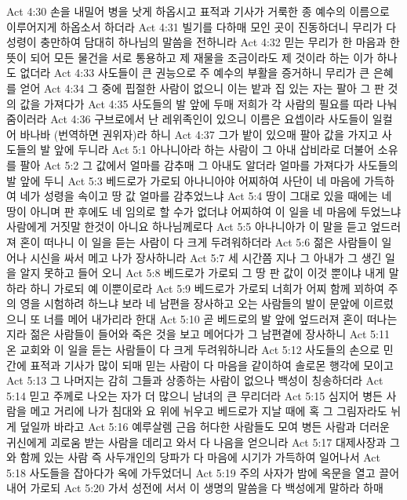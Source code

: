 Act 4:30  손을 내밀어 병을 낫게 하옵시고 표적과 기사가 거룩한 종 예수의 이름으로 이루어지게 하옵소서 하더라
Act 4:31  빌기를 다하매 모인 곳이 진동하더니 무리가 다 성령이 충만하여 담대히 하나님의 말씀을 전하니라
Act 4:32  믿는 무리가 한 마음과 한 뜻이 되어 모든 물건을 서로 통용하고 제 재물을 조금이라도 제 것이라 하는 이가 하나도 없더라
Act 4:33  사도들이 큰 권능으로 주 예수의 부활을 증거하니 무리가 큰 은혜를 얻어
Act 4:34  그 중에 핍절한 사람이 없으니 이는 밭과 집 있는 자는 팔아 그 판 것의 값을 가져다가
Act 4:35  사도들의 발 앞에 두매 저희가 각 사람의 필요를 따라 나눠줌이러라
Act 4:36  구브로에서 난 레위족인이 있으니 이름은 요셉이라 사도들이 일컬어 바나바 (번역하면 권위자)라 하니
Act 4:37  그가 밭이 있으매 팔아 값을 가지고 사도들의 발 앞에 두니라
Act 5:1  아나니아라 하는 사람이 그 아내 삽비라로 더불어 소유를 팔아
Act 5:2  그 값에서 얼마를 감추매 그 아내도 알더라 얼마를 가져다가 사도들의 발 앞에 두니
Act 5:3  베드로가 가로되 아나니아야 어찌하여 사단이 네 마음에 가득하여 네가 성령을 속이고 땅 값 얼마를 감추었느냐
Act 5:4  땅이 그대로 있을 때에는 네 땅이 아니며 판 후에도 네 임의로 할 수가 없더냐 어찌하여 이 일을 네 마음에 두었느냐 사람에게 거짓말 한것이 아니요 하나님께로다
Act 5:5  아나니아가 이 말을 듣고 엎드러져 혼이 떠나니 이 일을 듣는 사람이 다 크게 두려워하더라
Act 5:6  젊은 사람들이 일어나 시신을 싸서 메고 나가 장사하니라
Act 5:7  세 시간쯤 지나 그 아내가 그 생긴 일을 알지 못하고 들어 오니
Act 5:8  베드로가 가로되 그 땅 판 값이 이것 뿐이냐 내게 말하라 하니 가로되 예 이뿐이로라
Act 5:9  베드로가 가로되 너희가 어찌 함께 꾀하여 주의 영을 시험하려 하느냐 보라 네 남편을 장사하고 오는 사람들의 발이 문앞에 이르렀으니 또 너를 메어 내가리라 한대
Act 5:10  곧 베드로의 발 앞에 엎드러져 혼이 떠나는지라 젊은 사람들이 들어와 죽은 것을 보고 메어다가 그 남편곁에 장사하니
Act 5:11  온 교회와 이 일을 듣는 사람들이 다 크게 두려워하니라
Act 5:12  사도들의 손으로 민간에 표적과 기사가 많이 되매 믿는 사람이 다 마음을 같이하여 솔로몬 행각에 모이고
Act 5:13  그 나머지는 감히 그들과 상종하는 사람이 없으나 백성이 칭송하더라
Act 5:14  믿고 주께로 나오는 자가 더 많으니 남녀의 큰 무리더라
Act 5:15  심지어 병든 사람을 메고 거리에 나가 침대와 요 위에 뉘우고 베드로가 지날 때에 혹 그 그림자라도 뉘게 덮일까 바라고
Act 5:16  예루살렘 근읍 허다한 사람들도 모여 병든 사람과 더러운 귀신에게 괴로움 받는 사람을 데리고 와서 다 나음을 얻으니라
Act 5:17  대제사장과 그와 함께 있는 사람 즉 사두개인의 당파가 다 마음에 시기가 가득하여 일어나서
Act 5:18  사도들을 잡아다가 옥에 가두었더니
Act 5:19  주의 사자가 밤에 옥문을 열고 끌어내어 가로되
Act 5:20  가서 성전에 서서 이 생명의 말씀을 다 백성에게 말하라 하매
